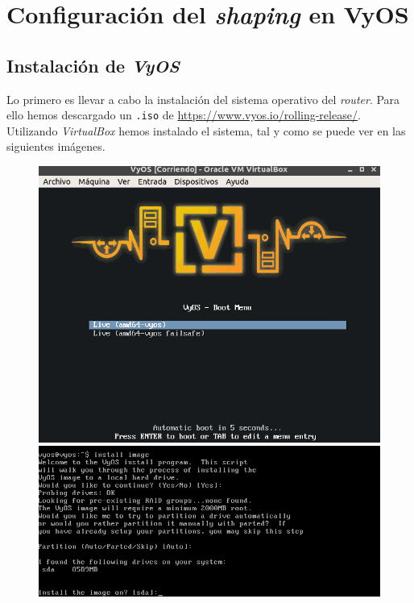 \documentclass[11pt,a4paper]{article}
\begin{document}

\newpage

\section{Configuración del \textit{shaping} en VyOS}

\subsection{Instalación de \textit{VyOS}}

Lo primero es llevar a cabo la instalación del sistema operativo del \textit{router}. Para ello hemos descargado un \texttt{.iso} de \color{blue}\url{https://www.vyos.io/rolling-release/}\color{black}.\\

Utilizando \textit{VirtualBox} hemos instalado el sistema, tal y como se puede ver en las siguientes imágenes.

\begin{figure}[H]
	\centering
	\includegraphics[scale=0.35]{img/init.png}
	\includegraphics[scale=0.32]{img/instalacion-imagen.png}
\end{figure}
\end{document}
